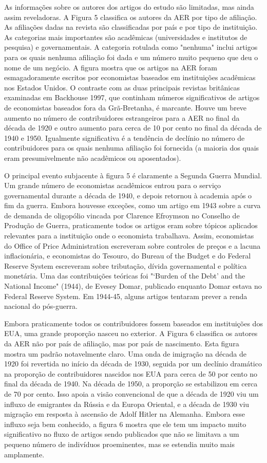\documentclass[12pt]{article}
\begin{document}
As informações sobre os autores dos artigos do estudo são limitadas, mas ainda assim reveladoras. A Figura 5 classifica os autores da AER por tipo de afiliação. As afiliações dadas na revista são classificadas por país e por tipo de instituição. As categorias mais importantes são acadêmicas (universidades e institutos de pesquisa) e governamentais. A categoria rotulada como "nenhuma" inclui artigos para os quais nenhuma afiliação foi dada e um número muito pequeno que deu o nome de um negócio. A figura mostra que os artigos na AER foram esmagadoramente escritos por economistas baseados em instituições acadêmicas nos Estados Unidos. O contraste com as duas principais revistas britânicas examinadas em Backhouse 1997, que continham números significativos de artigos de economistas baseados fora da Grã-Bretanha, é marcante. Houve um breve aumento no número de contribuidores estrangeiros para a AER no final da década de 1920 e outro aumento para cerca de 10 por cento no final da década de 1940 e 1950. Igualmente significativa é a tendência de declínio no número de contribuidores para os quais nenhuma afiliação foi fornecida (a maioria dos quais eram presumivelmente não acadêmicos ou aposentados).

O principal evento subjacente à figura 5 é claramente a Segunda Guerra Mundial. Um grande número de economistas acadêmicos entrou para o serviço governamental durante a década de 1940, e depois retornou à academia após o fim da guerra. Embora houvesse exceções, como um artigo em 1943 sobre a curva de demanda de oligopólio vincada por Clarence Efroymson no Conselho de Produção de Guerra, praticamente todos os artigos eram sobre tópicos aplicados relevantes para a instituição onde o economista trabalhava. Assim, economistas do Office of Price Administration escreveram sobre controles de preços e a lacuna inflacionária, e economistas do Tesouro, do Bureau of the Budget e do Federal Reserve System escreveram sobre tributação, dívida governamental e política monetária. Uma das contribuições teóricas foi "‘Burden of the Debt’ and the National Income" (1944), de Evesey Domar, publicado enquanto Domar estava no Federal Reserve System. Em 1944-45, alguns artigos tentaram prever a renda nacional do pós-guerra.

Embora praticamente todos os contribuidores fossem baseados em instituições dos EUA, uma grande proporção nasceu no exterior. A Figura 6 classifica os autores da AER não por país de afiliação, mas por país de nascimento. Esta figura mostra um padrão notavelmente claro. Uma onda de imigração na década de 1920 foi revertida no início da década de 1930, seguida por um declínio dramático na proporção de contribuidores nascidos nos EUA para cerca de 50 por cento no final da década de 1940. Na década de 1950, a proporção se estabilizou em cerca de 70 por cento. Isso apoia a visão convencional de que a década de 1920 viu um influxo de emigrantes da Rússia e da Europa Oriental, e a década de 1930 viu migração em resposta à ascensão de Adolf Hitler na Alemanha. Embora esse influxo seja bem conhecido, a figura 6 mostra que ele tem um impacto muito significativo no fluxo de artigos sendo publicados que não se limitava a um pequeno número de indivíduos proeminentes, mas se estendia muito mais amplamente.
\end{document}

